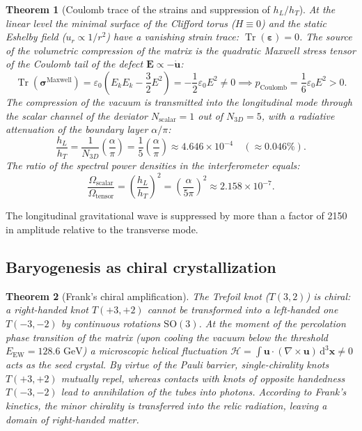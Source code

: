 \documentclass[11pt,a4paper]{article}
\newtheorem{theorem}{Theorem}
\theoremstyle{definition}
\theoremstyle{remark}
\begin{document}
\begin{theorem}[Coulomb trace of the strains and suppression of $h_L / h_T$]
	\label{thm:coulomb_gw_suppression}
	At the linear level the minimal surface of the Clifford torus ($H \equiv 0$) and the static Eshelby field ($u_r \propto 1/r^2$) have a vanishing strain trace: $\operatorname{Tr}(\boldsymbol{\varepsilon}) = 0$. The source of the volumetric compression of the matrix is the quadratic Maxwell stress tensor of the Coulomb tail of the defect $\mathbf{E} \propto -\dot{\mathbf{u}}$:
	\begin{equation}
		\operatorname{Tr}(\boldsymbol{\sigma}^{\mathrm{Maxwell}}) = \varepsilon_0 \left( E_k E_k - \frac{3}{2} E^2 \right) = -\frac{1}{2}\varepsilon_0 E^2 \ne 0 \implies p_{\mathrm{Coulomb}} = \frac{1}{6}\varepsilon_0 E^2 > 0.
		\label{eq:maxwell_stress_trace}
	\end{equation}
	The compression of the vacuum is transmitted into the longitudinal mode through the scalar channel of the deviator $N_{\mathrm{scalar}} = 1$ out of $N_{3D} = 5$, with a radiative attenuation of the boundary layer $\alpha/\pi$:
	\begin{equation}
		\frac{h_L}{h_T} = \frac{1}{N_{3D}} \left(\frac{\alpha}{\pi}\right) = \frac{1}{5}\left(\frac{\alpha}{\pi}\right) \approx 4.646 \times 10^{-4} \quad (\approx 0.046\%).
		\label{eq:gw_scalar_amplitude_suppression}
	\end{equation}
	The ratio of the spectral power densities in the interferometer equals:
	\begin{equation}
		\frac{\Omega_{\mathrm{scalar}}}{\Omega_{\mathrm{tensor}}} = \left(\frac{h_L}{h_T}\right)^2 = \left(\frac{\alpha}{5\pi}\right)^2 \approx 2.158 \times 10^{-7}.
		\label{eq:gw_scalar_power_suppression}
	\end{equation}
\end{theorem}
The longitudinal gravitational wave is suppressed by more than a factor of 2150 in amplitude relative to the transverse mode.

\subsection{Baryogenesis as chiral crystallization}

\begin{theorem}[Frank's chiral amplification]
\label{thm:baryogenesis_chiral}
The Trefoil knot ($T(3,2)$) is chiral: a right-handed knot $T(+3, +2)$ cannot be transformed into a left-handed one $T(-3, -2)$ by continuous rotations $\mathrm{SO}(3)$. At the moment of the percolation phase transition of the matrix (upon cooling the vacuum below the threshold $E_{\mathrm{EW}} = 128.6\text{ GeV}$) a microscopic helical fluctuation $\mathcal{H} = \int \mathbf{u} \cdot (\nabla \times \mathbf{u})\,\mathrm{d}^3\mathbf{x} \ne 0$ acts as the seed crystal. By virtue of the Pauli barrier, single-chirality knots $T(+3,+2)$ mutually repel, whereas contacts with knots of opposite handedness $T(-3,-2)$ lead to annihilation of the tubes into photons. According to Frank's kinetics, the minor chirality is transferred into the relic radiation, leaving a domain of right-handed matter.
\end{theorem}
\end{document}
